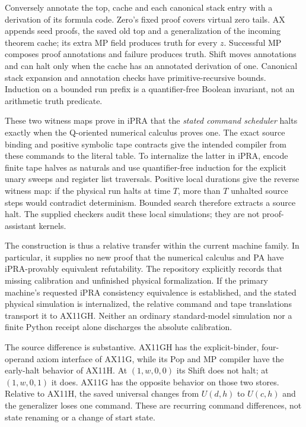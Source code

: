 Conversely annotate the top, cache and each canonical stack entry with
a derivation of its formula code. Zero's fixed proof covers virtual zero
tails. AX appends seed proofs, the saved old top and a generalization of
the incoming theorem cache; its extra MP field produces truth for every
$z$. Successful MP composes proof annotations and failure produces truth.
Shift moves annotations and can halt only when the cache has an annotated
derivation of one. Canonical stack expansion and annotation checks have
primitive-recursive bounds. Induction on a bounded run prefix is a
quantifier-free Boolean invariant, not an arithmetic truth predicate.

These two witness maps prove in iPRA that the \emph{stated command
scheduler} halts exactly when the Q-oriented numerical calculus proves
one. The exact source binding and positive symbolic tape contracts give
the intended compiler from these commands to the literal table. To
internalize the latter in iPRA, encode finite tape halves as naturals and
use quantifier-free induction for the explicit unary sweeps and register
list traversals. Positive local durations give the reverse witness map:
if the physical run halts at time $T$, more than $T$ unhalted source
steps would contradict determinism. Bounded search therefore extracts a
source halt. The supplied checkers audit these local simulations; they
are not proof-assistant kernels.

The construction is thus a relative transfer within the current machine
family. In particular, it supplies no new proof that the numerical
calculus and PA have iPRA-provably equivalent refutability. The repository
explicitly records that missing calibration and unfinished physical
formalization. If the primary machine's requested iPRA consistency
equivalence is established, and the stated physical simulation is
internalized, the relative command and tape translations transport it to
AX11GH. Neither an ordinary standard-model simulation
nor a finite Python receipt alone discharges the absolute calibration.

The source difference is substantive. AX11GH has the explicit-binder,
four-operand axiom interface of AX11G, while its Pop and MP compiler have
the early-halt behavior of AX11H. At $(1,w,0,0)$ its Shift does not halt;
at $(1,w,0,1)$ it does. AX11G has the opposite behavior on those two
stores. Relative to AX11H, the saved universal changes from $U(d,h)$
to $U(c,h)$ and the generalizer loses one command. These are recurring
command differences, not state renaming or a change of start state.
